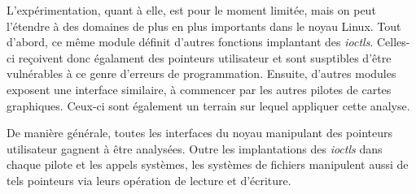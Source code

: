 L'expérimentation, quant à elle, est pour le moment limitée, mais on peut
l'étendre à des domaines de plus en plus importants dans le noyau Linux.
Tout d'abord, ce même module définit d'autres fonctions implantant des
\emph{ioctls}. Celles-ci reçoivent donc égalament des pointeurs utilisateur et
sont susptibles d'être vulnérables à ce genre d'erreurs de programmation.
Ensuite, d'autres modules exposent une interface similaire, à commencer par les
autres pilotes de cartes graphiques. Ceux-ci sont également un terrain sur
lequel appliquer cette analyse.

De manière générale, toutes les interfaces du noyau manipulant des pointeurs
utilisateur gagnent à être analysées. Outre les implantations des \emph{ioctls}
dans chaque pilote et les appels systèmes, les systèmes de fichiers manipulent
aussi de tels pointeurs via leurs opération de lecture et d'écriture.

